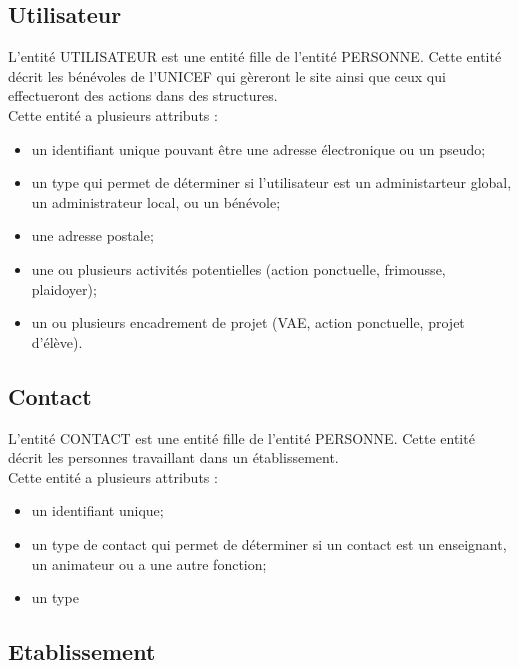 \documentclass[asi, sansVersion]{picINSA}
\begin{document}
\subsection*{Utilisateur}

L'entité UTILISATEUR est une entité fille de l'entité PERSONNE. Cette entité décrit les bénévoles de l'UNICEF qui gèreront le site ainsi que ceux qui effectueront des actions dans des structures. \\
Cette entité a plusieurs attributs : 
\begin{itemize}
\item un identifiant unique pouvant être une adresse électronique ou un pseudo;  
\item un type qui permet de déterminer si l'utilisateur est un administarteur global, un administrateur local, ou un bénévole;
\item une adresse postale;
\item une ou plusieurs activités potentielles (action ponctuelle, frimousse, plaidoyer); %
\item un ou plusieurs encadrement de projet (VAE, action ponctuelle, projet d'élève). %
\end{itemize}

\subsection*{Contact}

L'entité CONTACT est une entité fille de l'entité PERSONNE. Cette entité décrit les personnes travaillant dans un établissement. \\
Cette entité a plusieurs attributs : 
\begin{itemize}
\item un identifiant unique;
\item un type de contact qui permet de déterminer si un contact est un enseignant, un animateur ou a une autre fonction; 
\item un type 
\end{itemize} 

\subsection*{Etablissement}
\end{document}
